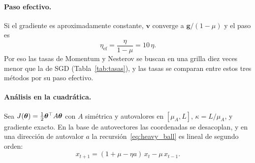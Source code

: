 \paragraph{Paso efectivo.} Si el gradiente es aproximadamente constante, $\mathbf{v}$ converge a $\mathbf{g}/(1 - \mu)$ y el paso es
\begin{equation}
  \eta_\text{ef} = \frac{\eta}{1 - \mu} = 10\,\eta.
  \label{eq:paso_efectivo}
\end{equation}
Por eso las tasas de Momentum y Nesterov se buscan en una grilla diez veces menor que la de SGD
(Tabla~\ref{tab:tasas}), y las tasas se comparan entre estos tres métodos por su paso efectivo.

\paragraph{Análisis en la cuadrática.} Sea $J(\boldsymbol{\theta}) = \frac12\boldsymbol{\theta}^\top A\boldsymbol{\theta}$ con $A$ simétrica y autovalores en $[\mu_A, L]$,
$\kappa = L/\mu_A$, y gradiente exacto. En la base de autovectores las coordenadas se desacoplan, y en una dirección de
autovalor $a$ la recursión~\eqref{eq:heavy_ball} es lineal de segundo orden:
\begin{equation}
  x_{t+1} = (1 + \mu - \eta a)\,x_t - \mu\,x_{t-1}.
\end{equation}

